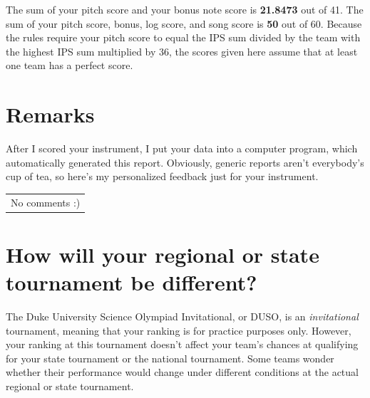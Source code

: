 \documentclass[12pt,letterpaper]{article}
\def\totalScore{50} %
\def\feedback{No comments :)}
\def\pitchScore{21.8473}
\begin{document}
The sum of your pitch score and your bonus note score is \textbf{\pitchScore} out of 41. The sum of your pitch score, bonus, log score, and song score is \textbf{\totalScore} out of 60. Because the rules require your pitch score to equal the IPS sum divided by the team with the highest IPS sum multiplied by 36, the scores given here assume that at least one team has a perfect score.

\section{Remarks}

After I scored your instrument, I put your data into a computer program, which automatically generated this report. Obviously, generic reports aren't everybody's cup of tea, so here's my personalized feedback just for your instrument. %

\hspace{0.5mm}\begin{tabular}{!{\color{hyblue!50}\vrule width 3pt}p{\textwidth-3.8mm}}\setlength{\parskip}{8pt}
{\feedback}
\end{tabular}

\section{How will your regional or state tournament be different?}

The Duke University Science Olympiad Invitational, or DUSO, is an \emph{invitational} tournament, meaning that your ranking is for practice purposes only. However, your ranking at this tournament doesn't affect your team's chances at qualifying for your state tournament or the national tournament. Some teams wonder whether their performance would change under different conditions at the actual regional or state tournament.
\end{document}
